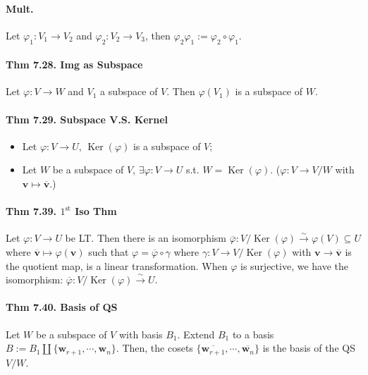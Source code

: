 \paragraph{Mult.} Let $\varphi_1:V_1\rightarrow V_2$ and $\varphi_2:V_2\rightarrow V_3$, then $\varphi_2\varphi_1:=\varphi_2\circ\varphi_1$.

\paragraph{Thm 7.28. Img as Subspace} Let $\varphi: V\rightarrow W$ and $V_1$ a subspace of $V$. Then $\varphi(V_1)$ is a subspace of $W$.

\paragraph{Thm 7.29. Subspace V.S. Kernel}
\begin{itemize}[noitemsep,nolistsep]
    \item Let $\varphi: V\rightarrow U$, $\operatorname{Ker}(\varphi)$ is a subspace of $V$; 
    \item Let $W$ be a subspace of $V$, $\exists \varphi :V\rightarrow U$ s.t. $W = \operatorname{Ker}(\varphi)$. ($\varphi: V \rightarrow V/W$ with $\mathbf{v} \mapsto \overline{\mathbf{v}}$.)
\end{itemize}

\paragraph{Thm 7.39. $1^\text{st}$ Iso Thm} Let $\varphi: V \rightarrow U$ be LT. Then there is an isomorphism $\overline{\varphi}:V/\operatorname{Ker}(\varphi) \xrightarrow{\mathtt{\sim}} \varphi(V) \subseteq U$ where $\overline{\mathbf{v}}\mapsto \varphi(\mathbf{v})$ such that $\varphi=\overline{\varphi}\circ\gamma$ where $\gamma:V\rightarrow V/\operatorname{Ker}(\varphi)$ with $\mathbf{v}\rightarrow\overline{\mathbf{v}}$ is the quotient map, is a linear transformation. When $\varphi$ is surjective, we have the isomorphism: $\overline{\varphi}: V / \operatorname{Ker}(\varphi) \stackrel{\sim}{\rightarrow} U$.

\paragraph{Thm 7.40. Basis of QS} Let $W$ be a subspace of $V$ with basis $B_1$. Extend $B_1$ to a basis $B:=B_1\coprod \{\mathbf{w}_{r+1}, \cdots, \mathbf{w}_n\}$. Then, the cosets $\{\overline{\mathbf{w}_{r+1}}, \cdots, \overline{\mathbf{w}_n}\}$ is the basis of the QS $V/W$.

